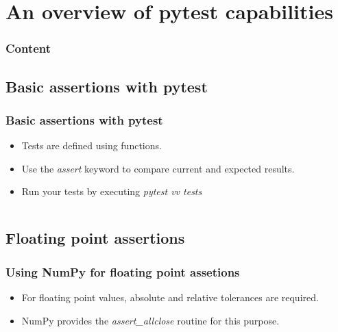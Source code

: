 \documentclass[t]{beamer}
\begin{document}
\section{An overview of pytest capabilities}

\begin{frame}
  \frametitle{Content}
  \tableofcontents[currentsection]
  \vspace{200pt}  %
\end{frame}


\subsection{Basic assertions with pytest}
\begin{frame}[fragile=singleslide]
  \frametitle{Basic assertions with pytest}

   \begin{itemize}
        \item Tests are defined using functions.
        \item Use the \textit{assert} keyword to compare current and expected results.
        \item Run your tests by executing \textit{pytest vv tests}
   \end{itemize}

   \inputminted[fontsize=\footnotesize]{python}{code/basic_assertion.py}

\end{frame}

\subsection{Floating point assertions}
\begin{frame}[fragile=singleslide]
  \frametitle{Using NumPy for floating point assetions}

   \begin{itemize}
        \item For floating point values, absolute and relative tolerances are required.
        \item NumPy provides the \textit{assert\_allclose} routine for this purpose.
   \end{itemize}


   \inputminted[fontsize=\footnotesize]{python}{code/floating_point_assertion.py}


\end{frame}
\end{document}
